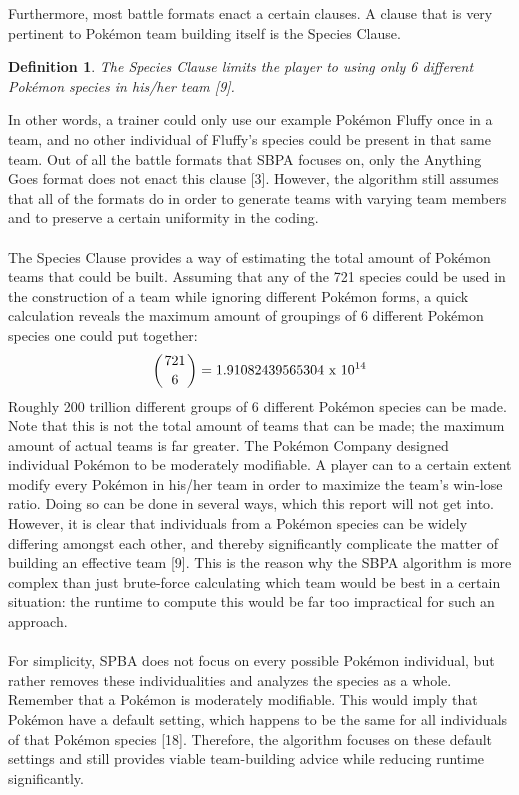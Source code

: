 \documentclass{article}
\newtheorem{definition}{Definition}
\begin{document}
Furthermore, most battle formats enact a certain clauses. A clause that is very pertinent to Pok\'emon team building itself is the Species Clause.
\begin{definition}\label{SpeciesClause}
	The Species Clause limits the player to using only 6 different Pok\'emon species in his/her team [9].
\end{definition}
In other words, a trainer could only use our example Pok\'emon Fluffy once in a team, and no other individual of Fluffy's species could be present in that same team. Out of all the battle formats that SBPA focuses on, only the Anything Goes format does not enact this clause [3]. However, the algorithm still assumes that all of the formats do in order to generate teams with varying team members and to preserve a certain uniformity in the coding.\\\\
The Species Clause provides a way of estimating the total amount of Pok\'emon teams that could be built. Assuming that any of the 721 species could be used in the construction of a team while ignoring different Pok\'emon forms, a quick calculation reveals the maximum amount of groupings of 6 different Pok\'emon species one could put together:
\begin{equation*}
	\left({721 \above 0pt 6}\right)=1.91082439565304\text{ x }10^{14}
\end{equation*}
Roughly 200 trillion different groups of 6 different Pok\'emon species can be made. Note that this is not the total amount of teams that can be made; the maximum amount of actual teams is far greater. The Pok\'emon Company designed individual Pok\'emon to be moderately modifiable. A player can to a certain extent modify every Pok\'emon in his/her team in order to maximize the team's win-lose ratio. Doing so can be done in several ways, which this report will not get into. However, it is clear that individuals from a Pok\'emon species can be widely differing amongst each other, and thereby significantly  complicate the matter of building an effective team [9]. This is the reason why the SBPA algorithm is more complex than just brute-force calculating which team would be best in a certain situation: the runtime to compute this would be far too impractical for such an approach.\\\\
For simplicity, SPBA does not focus on every possible Pok\'emon individual, but rather removes these individualities and analyzes the species as a whole. Remember that a Pok\'emon is moderately modifiable. This would imply that Pok\'emon have a default setting, which happens to be the same for all individuals of that Pok\'emon species [18]. Therefore, the algorithm focuses on these default settings and still provides viable team-building advice while reducing runtime significantly.\\\\
\end{document}
